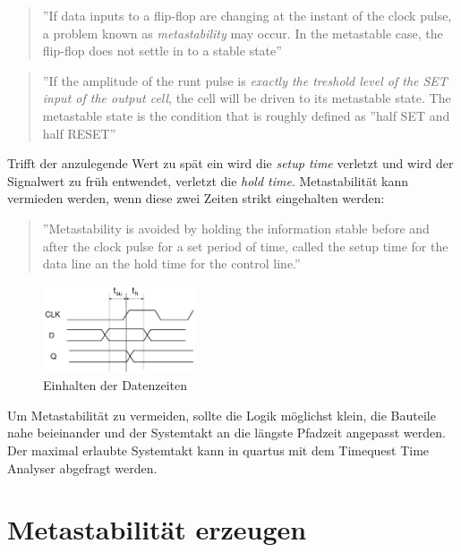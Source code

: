 \begin{quote}
''If data inputs to a flip-flop are changing at the instant of the clock pulse, a problem known as \textit{metastability} may occur. In the metastable case, the flip-flop does not settle in to a stable state'' \cite{ReferenceManual}
\end{quote}

\begin{quote}
''If the amplitude of the runt pulse is \textit{exactly the treshold level of the SET input of the output cell}, the cell will be driven to its metastable state. The metastable state is the condition that is roughly defined as ''half SET and half RESET'' \cite{F_metastability}
\end{quote}

Trifft der anzulegende Wert zu spät ein wird die \textit{setup time} verletzt und wird der Signalwert zu früh entwendet, verletzt die \textit{hold time}. Metastabilität kann vermieden werden, wenn diese zwei Zeiten strikt eingehalten werden:

\begin{quote}
''Metastability is avoided by holding the information stable before and after the clock pulse  for a set period of time, called the setup time for the data line an the hold time for the control line.''\cite{ReferenceManual}
\end{quote}

\begin{figure}[H]
	\includegraphics[width=0.4\textwidth]{images/metastability/kritscheZeit_FF.png}
	\caption{Einhalten der Datenzeiten}
	\label{fig.metastabil.kritisches_zeitfenster}
\end{figure}

Um Metastabilität zu vermeiden, sollte die Logik möglichst klein, die Bauteile nahe beieinander und der Systemtakt an die längste Pfadzeit angepasst werden. Der maximal erlaubte Systemtakt kann in quartus mit dem Timequest Time Analyser abgefragt werden.

\section{Metastabilität erzeugen}\label{sect.meatastabil_erzeugen}

